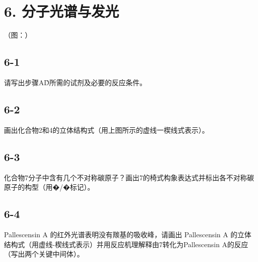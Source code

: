 \section*{6. 分子光谱与发光}
（图：）

\subsection*{6-1}
请写出步骤A\~D所需的试剂及必要的反应条件。

\subsection*{6-2}
画出化合物2和4的⽴体结构式（⽤上图所⽰的虚线⼀楔线式表⽰）。

\subsection*{6-3}
化合物7分⼦中含有⼏个不对称碳原⼦？画出7的椅式构象表达式并标出各不对称碳原⼦的构型（⽤�/�标记）。

\subsection*{6-4}
Pallescensin A 的红外光谱表明没有羰基的吸收峰，请画出 Pallescensin A 的⽴体结构式（⽤虚线-楔线式表⽰）并⽤反应机理解释由7转化为Pallescensin A的反应（写出两个关键中间体）。
